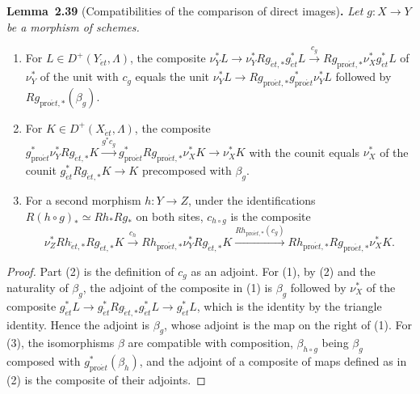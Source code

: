 \documentclass[11pt]{article}
\newenvironment{bpstatement}[2]{\par\addvspace{0.6\baselineskip}\noindent\textbf{#1}#2\textbf{.}\enspace\ignorespaces}
  {\par\addvspace{0.4\baselineskip}}
\newenvironment{bpstatementit}[2]{\begin{bpstatement}{#1}{#2}\itshape\ignorespaces}{\end{bpstatement}}
\begin{document}
\label{bp116}%
\begin{bpstatementit}{Lemma~2.39}{ (Compatibilities of the comparison of direct images)}
Let \(g:X\to Y\) be a morphism of schemes.

\begin{enumerate}
\item For \(L\in D^+(Y_{\acute{e}t},\Lambda)\), the composite \(\nu_Y^*L\to\nu_Y^*Rg_{\acute{e}t,*}g_{\acute{e}t}^*L\xrightarrow{c_g}
  Rg_{\mathrm{pro}\acute{e}t,*}\nu_X^*g_{\acute{e}t}^*L\) of \(\nu_Y^*\) of the unit with \(c_g\) equals the unit \(\nu_Y^*L\to Rg_{\mathrm{pro}\acute{e}t,*}g_{\mathrm{pro}\acute{e}t}^*\nu_Y^*L\) followed by \(Rg_{\mathrm{pro}\acute{e}t,*}(\beta_g)\).
\item For \(K\in D^+(X_{\acute{e}t},\Lambda)\), the composite \(g_{\mathrm{pro}\acute{e}t}^*\nu_Y^*Rg_{\acute{e}t,*}K\xrightarrow{g^*c_g}
  g_{\mathrm{pro}\acute{e}t}^*Rg_{\mathrm{pro}\acute{e}t,*}\nu_X^*K\to\nu_X^*K\) with the counit equals \(\nu_X^*\) of the counit \(g_{\acute{e}t}^*Rg_{\acute{e}t,*}K\to K\) precomposed with \(\beta_g\).
\item For a second morphism \(h:Y\to Z\), under the identifications \(R(h\circ g)_*\simeq Rh_*Rg_*\) on both sites, \(c_{h\circ g}\) is the composite \[
   \nu_Z^*Rh_{\acute{e}t,*}Rg_{\acute{e}t,*}K\xrightarrow{c_h}
   Rh_{\mathrm{pro}\acute{e}t,*}\nu_Y^*Rg_{\acute{e}t,*}K\xrightarrow{Rh_{\mathrm{pro}\acute{e}t,*}(c_g)}
   Rh_{\mathrm{pro}\acute{e}t,*}Rg_{\mathrm{pro}\acute{e}t,*}\nu_X^*K .
   \]
\end{enumerate}
\end{bpstatementit}

\begin{proof}[{Proof}]\label{bp117}%
Part (2) is the definition of \(c_g\) as an adjoint. For (1), by (2) and the naturality of \(\beta_g\), the adjoint of the composite in (1) is \(\beta_g\) followed by \(\nu_X^*\) of the composite \(g^*_{\acute{e}t}L\to g^*_{\acute{e}t}Rg_{\acute{e}t,*}g^*_{\acute{e}t}L\to g^*_{\acute{e}t}L\), which is the identity by the triangle identity. Hence the adjoint is \(\beta_g\), whose adjoint is the map on the right of (1). For (3), the isomorphisms \(\beta\) are compatible with composition, \(\beta_{h\circ g}\) being \(\beta_g\) composed with \(g_{\mathrm{pro}\acute{e}t}^*(\beta_h)\), and the adjoint of a composite of maps defined as in (2) is the composite of their adjoints.
\end{proof}
\end{document}
